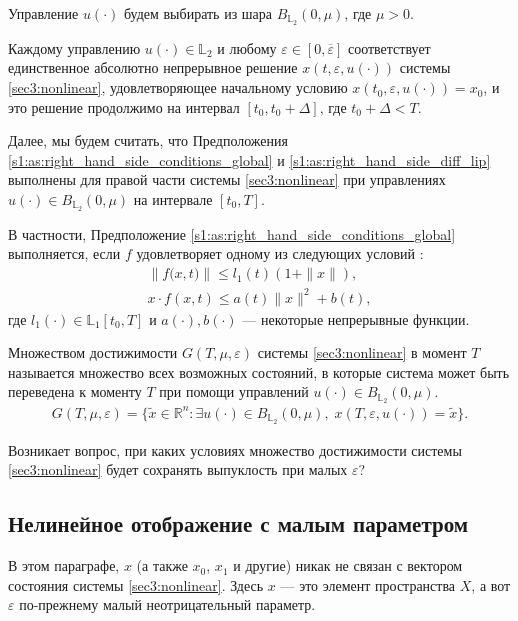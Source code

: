 \documentclass[../main.tex]{subfiles}
\begin{document}
Управление $ u(\cdot) $ будем выбирать из шара $ B_{\mathbb{L}_2}(0,\mu) $, где $ \mu > 0$.

Каждому управлению $u(\cdot) \in \mathbb{L}_2$ и любому $\varepsilon \in [0,\overline{\varepsilon}]$ соответствует единственное абсолютно непрерывное решение $ x(t,\varepsilon, u(\cdot)) $ системы \eqref{sec3:nonlinear}, удовлетворяющее начальному условию $ x(t_0,\varepsilon, u(\cdot)) = x_0$, и это решение продолжимо на интервал $[t_0, t_0 + \Delta]$, где $t_0 + \Delta < T$. 

Далее, мы будем считать, что Предположения \ref{s1:as:right_hand_side_conditions_global} и \ref{s1:as:right_hand_side_diff_lip} выполнены для правой части системы  \eqref{sec3:nonlinear} при управлениях $ u(\cdot) \in B_{\mathbb{L}_2}(0,\mu) $ на интервале $ [t_0, T]$.

В частности, Предположение \ref{s1:as:right_hand_side_conditions_global} выполняется, если  $f$ удовлетворяет одному из следующих условий \cite{Filippov2}:
\begin{gather}\label{sec3:sublinear_growth}
    \left\|f\big(x,t\big) \right\| \leqslant l_1(t) (1 + \|x\|), \\ 
    x \cdot f(x,t) \leqslant a(t) \|x\|^2 + b(t),
\end{gather}
где $l_1(\cdot) \in \mathbb{L}_1[t_0,T]$ и $a(\cdot), b(\cdot)$ --- некоторые непрерывные функции.

\begin{definition} 
    Множеством достижимости $G(T,\mu,\varepsilon) $ системы \eqref{sec3:nonlinear} в момент $T$ называется множество всех возможных состояний, в которые система может быть переведена  к моменту $T$ при помощи управлений  $ u(\cdot) \in B_{\mathbb{L}_2}(0,\mu) $.
    \begin{gather*}
        G(T,\mu,\varepsilon) =\{\widetilde{x}\in \mathbb{R}^n:\exists u(\cdot)\in B_{\mathbb{L}_2}(0,\mu),\; x(T,\varepsilon,u(\cdot)) = \widetilde{x}\}.
    \end{gather*}
\end{definition} 
Возникает вопрос, при каких условиях множество достижимости системы \eqref{sec3:nonlinear} будет сохранять выпуклость при малых $\varepsilon$?

\subsection{Нелинейное отображение с малым параметром}

В этом параграфе, $x$ (а также $x_0$, $x_1$ и другие) никак не связан с вектором состояния системы \eqref{sec3:nonlinear}.
Здесь $x$ --- это элемент пространства $X$, а вот $\varepsilon$ по-прежнему малый неотрицательный параметр.
\end{document}
